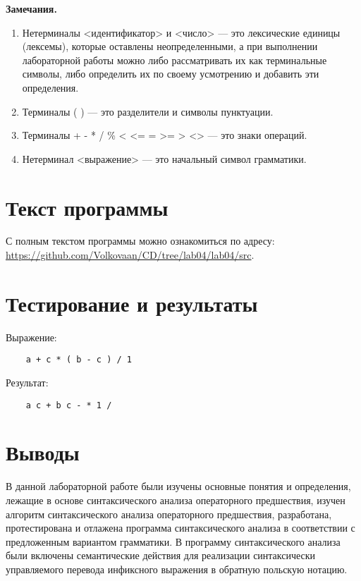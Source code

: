 \documentclass{bmstu-gost-7-32}
\begin{document}
\textbf{Замечания.}

\begin{enumerate}
	\item Нетерминалы <идентификатор> и <число> — это лексические единицы (лексемы), которые оставлены неопределенными, а при выполнении лабораторной работы можно либо рассматривать их как терминальные символы, либо определить их по своему усмотрению и добавить эти определения.
	\item Терминалы ( ) — это разделители и символы пунктуации.
	\item Терминалы + - * / \% < <= = >= > <> — это знаки операций.
	\item Нетерминал <выражение> — это начальный символ грамматики.
\end{enumerate}

\section*{Текст программы}

С полным текстом программы можно ознакомиться по адресу: \url{https://github.com/Volkovaan/CD/tree/lab04/lab04/src}.

\section*{Тестирование и результаты}

Выражение:
\begin{verbatim}
	a + c * ( b - c ) / 1
\end{verbatim}

Результат:
\begin{verbatim}
	a c + b c - * 1 /
\end{verbatim}

\section*{Выводы}

В данной лабораторной работе были изучены основные понятия и определения, лежащие в основе синтаксического анализа операторного предшествия, изучен алгоритм синтаксического анализа операторного предшествия, разработана, протестирована и отлажена программа синтаксического анализа в соответствии с предложенным вариантом грамматики.
В программу синтаксического анализа были включены семантические действия для реализации синтаксически управляемого перевода инфиксного выражения в обратную польскую нотацию.
\end{document}
